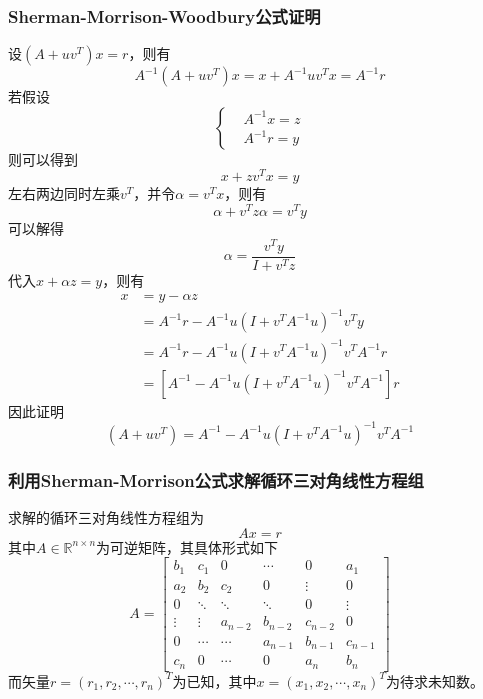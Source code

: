 \documentclass[twoside,twocolumn]{article}
\begin{document}
\begin{CJK*}{UTF8}{gkai}
\subsubsection{Sherman-Morrison-Woodbury公式证明}
设$(A+uv^{T})x=r$，则有
\begin{equation*}
	A^{-1}(A+uv^{T})x=x+A^{-1}uv^{T}x=A^{-1}r
\end{equation*}
若假设
\begin{equation*}
	\left\{
	\begin{aligned}
		&A^{-1}x=z\\
		&A^{-1}r=y
	\end{aligned}
	\right.
\end{equation*}
则可以得到
\begin{equation*}
	x+zv^{T}x=y
\end{equation*}
左右两边同时左乘$v^{T}$，并令$\alpha=v^{T}x$，则有
\begin{equation*}
	\alpha+v^{T}z\alpha=v^{T}y
\end{equation*}
可以解得
\begin{equation*}
	\alpha=\frac{v^{T}y}{I+v^{T}z}
\end{equation*}
代入$x+\alpha z=y$，则有
\begin{equation*}
	\begin{aligned}
		x&=y-\alpha z\\
		&=A^{-1}r-A^{-1}u(I+v^{T}A^{-1}u)^{-1}v^{T}y\\
		&=A^{-1}r-A^{-1}u(I+v^{T}A^{-1}u)^{-1}v^{T}A^{-1}r\\
		&=[A^{-1}-A^{-1}u(I+v^{T}A^{-1}u)^{-1}v^{T}A^{-1}]r
	\end{aligned}
\end{equation*}
因此证明
\begin{equation*}
	(A+uv^{T})=A^{-1}-A^{-1}u(I+v^{T}A^{-1}u)^{-1}v^{T}A^{-1}
\end{equation*}
\subsubsection{利用Sherman-Morrison公式求解循环三对角线性方程组}
求解的循环三对角线性方程组为
\begin{equation*}
	Ax=r
\end{equation*}
其中$A\in \mathbb{R}^{n\times n}$为可逆矩阵，其具体形式如下
\begin{equation*}
	A=
	\begin{bmatrix} 
		b_1&c_1&0&\cdots&0&a_1\\
		a_2&b_2&c_2&0&\vdots&0\\
		0&\ddots&\ddots&\ddots&0&\vdots\\
		\vdots&\vdots&a_{n-2}&b_{n-2}&c_{n-2}&0\\
		0&\cdots&\cdots&a_{n-1}&b_{n-1}&c_{n-1}\\
		c_n&0&\cdots&0&a_n&b_n
	\end{bmatrix}
\end{equation*}
而矢量$r=(r_{1},r_{2},\cdots,r_{n})^{T}$为已知，其中$x=(x_{1},x_{2},\cdots,x_{n})^{T}$为待求未知数。


\end{CJK*}
\end{document}
